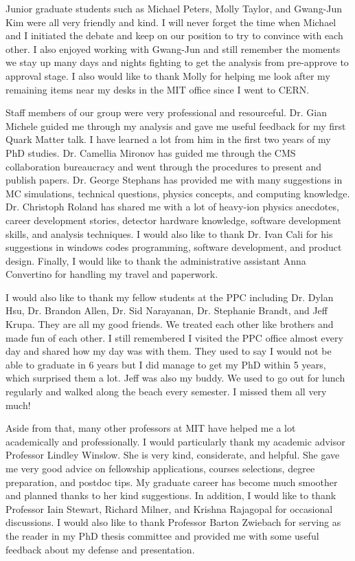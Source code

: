 Junior graduate students such as Michael Peters, Molly Taylor, and Gwang-Jun Kim were all very friendly and kind. I will never forget the time when Michael and I initiated the debate and keep on our position to try to convince with each other. I also enjoyed working with Gwang-Jun and still remember the moments we stay up many days and nights fighting to get the analysis from pre-approve to approval stage. I also would like to thank Molly for helping me look after my remaining items near my desks in the MIT office since I went to CERN. 


Staff members of our group were very professional and resourceful. Dr. Gian Michele guided me through my analysis and gave me useful feedback for my first Quark Matter talk. I have learned a lot from him in the first two years of my PhD studies. Dr. Camellia Mironov has guided me through the CMS collaboration bureaucracy and went through the procedures to present and publish papers. Dr. George Stephans has provided me with many suggestions in MC simulations, technical questions, physics concepts, and computing knowledge. Dr. Christoph Roland has shared me with a lot of heavy-ion physics anecdotes, career development stories, detector hardware knowledge, software development skills, and analysis techniques. I would also like to thank Dr. Ivan Cali for his suggestions in windows codes programming, software development, and product design. Finally, I would like to thank the administrative assistant Anna Convertino for handling my travel and paperwork.  


I would also like to thank my fellow students at the PPC including Dr. Dylan Hsu, Dr. Brandon Allen, Dr. Sid Narayanan, Dr. Stephanie Brandt, and Jeff Krupa. They are all my good friends. We treated each other like brothers and made fun of each other. I still remembered I visited the PPC office almost every day and shared how my day was with them. They used to say I would not be able to graduate in 6 years but I did manage to get my PhD within 5 years, which surprised them a lot. Jeff was also my buddy. We used to go out for lunch regularly and walked along the beach every semester. I missed them all very much!

Aside from that, many other professors at MIT have helped me a lot academically and professionally. I would particularly thank my academic advisor Professor Lindley Winslow. She is very kind, considerate, and helpful. She gave me very good advice on fellowship applications, courses selections, degree preparation, and postdoc tips. My graduate career has become much smoother and planned thanks to her kind suggestions. In addition, I would like to thank Professor Iain Stewart, Richard Milner, and Krishna Rajagopal for occasional discussions. I would also like to thank Professor Barton Zwiebach for serving as the reader in my PhD thesis committee and provided me with some useful feedback about my defense and presentation.

